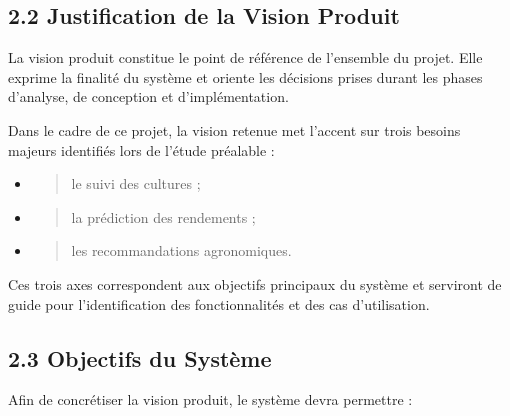 \documentclass[
]{article}
\begin{document}
\hypertarget{justification-de-la-vision-produit}{%
\subsection{2.2 Justification de la Vision
Produit}\label{justification-de-la-vision-produit}}

La vision produit constitue le point de référence de l'ensemble du
projet. Elle exprime la finalité du système et oriente les décisions
prises durant les phases d'analyse, de conception et d'implémentation.

Dans le cadre de ce projet, la vision retenue met l'accent sur trois
besoins majeurs identifiés lors de l'étude préalable :

\begin{itemize}
\item
  \begin{quote}
  le suivi des cultures ;
  \end{quote}
\item
  \begin{quote}
  la prédiction des rendements ;
  \end{quote}
\item
  \begin{quote}
  les recommandations agronomiques.
  \end{quote}
\end{itemize}

Ces trois axes correspondent aux objectifs principaux du système et
serviront de guide pour l'identification des fonctionnalités et des cas
d'utilisation.

\hypertarget{objectifs-du-systuxe8me}{%
\subsection{2.3 Objectifs du Système}\label{objectifs-du-systuxe8me}}

Afin de concrétiser la vision produit, le système devra permettre :
\end{document}
